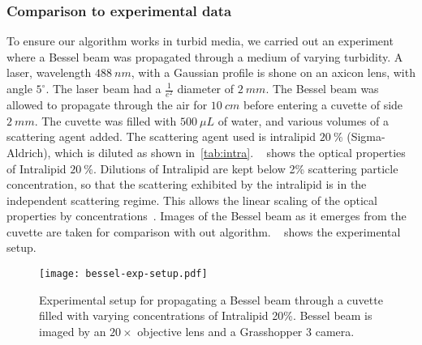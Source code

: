 \FloatBarrier

\subsubsection*{Comparison to experimental data}

To ensure our algorithm works in turbid media, we carried out an experiment where a Bessel beam was propagated through a medium of varying turbidity.
A laser, wavelength $488~nm$, with a Gaussian profile is shone on an axicon lens, with angle $5^{\circ}$.
The laser beam had a $\tfrac{1}{e^2}$ diameter of $2~mm$. 
The Bessel beam was allowed to propagate through the air for $10~cm$ before entering a cuvette of side $2~mm$.
The cuvette was filled with $500~\mu L$ of water, and various volumes of a scattering agent added.
The scattering agent used is intralipid $20~\%$ (Sigma-Aldrich), which is diluted as shown in~\cref{tab:intra}.
~ shows the optical properties of Intralipid $20~\%$.
Dilutions of Intralipid are kept below 2\% scattering particle concentration, so that the scattering exhibited by the intralipid is in the independent scattering regime.
This allows the linear scaling of the optical properties by concentrations~\cite{aernouts2013supercontinuum,vardaki2015studying,di2011effect}.
Images of the Bessel beam as it emerges from the cuvette are taken for comparison with out algorithm.
~ shows the experimental setup.

\begin{figure}[ht!]
    \centering
    \texttt{[image: bessel-exp-setup.pdf]}
    \caption{Experimental setup for propagating a Bessel beam through a cuvette filled with varying concentrations of Intralipid 20\%. Bessel beam is imaged by an $20\times$ objective lens and a Grasshopper 3 camera.}
    \label{fig:expsetup}
\end{figure}


